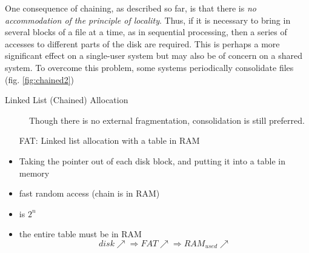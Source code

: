 One consequence of chaining, as described so far, is that there is \emph{no accommodation
  of the principle of locality}. Thus, if it is necessary to bring in several blocks of a
file at a time, as in sequential processing, then a series of accesses to different parts
of the disk are required. This is perhaps a more significant effect on a single-user
system but may also be of concern on a shared system. To overcome this problem, some
systems periodically consolidate files (fig.  \ref{fig:chained2})

\begin{frame}
  \begin{description}
  \item[Linked List (Chained) Allocation] Though there is no external fragmentation,
    consolidation is still preferred.
  \end{description}
  \centering
\end{frame}

\begin{frame}
  \begin{itemize}
  \item[FAT:] Linked list allocation with a table in RAM
  \end{itemize}
  \begin{minipage}{.65\textwidth}
    \begin{block}{}
      \begin{itemize}
      \item Taking the pointer out of each disk block, and putting it into a table in
        memory
      \item fast random access (chain is in RAM)
      \item is $2^n$
      \item the entire table must be in RAM
        $$disk\nearrow{}\Rightarrow FAT\nearrow{}\Rightarrow RAM_{used}\nearrow$$
      \end{itemize}
    \end{block}
  \end{minipage}\hfill
  \begin{minipage}{.3\textwidth}
    \centering
  \end{minipage}
\end{frame}


